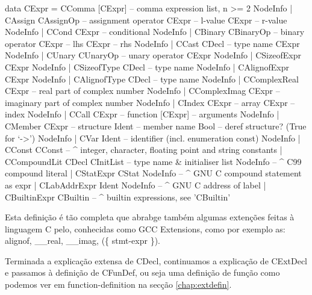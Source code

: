 \begin{haskell}
data CExpr = CComma       [CExpr]       -- comma expression list, n >= 2
             NodeInfo
           | CAssign      CAssignOp     -- assignment operator
             CExpr         -- l-value
             CExpr         -- r-value
             NodeInfo
           | CCond        CExpr         -- conditional
             NodeInfo
           | CBinary      CBinaryOp     -- binary operator
             CExpr         -- lhs
             CExpr         -- rhs
             NodeInfo
           | CCast        CDecl         -- type name
             CExpr
             NodeInfo
           | CUnary       CUnaryOp      -- unary operator
             CExpr
             NodeInfo
           | CSizeofExpr  CExpr
             NodeInfo
           | CSizeofType  CDecl         -- type name
             NodeInfo
           | CAlignofExpr CExpr
             NodeInfo
           | CAlignofType CDecl         -- type name
             NodeInfo
           | CComplexReal CExpr         -- real part of complex number
             NodeInfo
           | CComplexImag CExpr         -- imaginary part of complex number
             NodeInfo
           | CIndex       CExpr         -- array
             CExpr         -- index
             NodeInfo
           | CCall        CExpr         -- function
             [CExpr]       -- arguments
             NodeInfo
           | CMember      CExpr         -- structure
             Ident         -- member name
             Bool          -- deref structure? (True for `->')
             NodeInfo
           | CVar         Ident         -- identifier (incl. enumeration const)
             NodeInfo
           | CConst       CConst        -- ^ integer, character, floating point and string constants
           | CCompoundLit CDecl
             CInitList     -- type name & initialiser list
             NodeInfo      -- ^ C99 compound literal
           | CStatExpr    CStat NodeInfo  -- ^ GNU C compound statement as expr
           | CLabAddrExpr Ident NodeInfo  -- ^ GNU C address of label
           | CBuiltinExpr CBuiltin        -- ^ builtin expressions, see 'CBuiltin'
\end{haskell}
Esta definição é tão completa que abrabge também algumas extenções feitas à linguagem C pelo, conhecidas como
GCC Extensions, como por exemplo as: alignof, \_\_real, \_\_imag, (\{ stmt-expr \}).

Terminada a explicação extensa de \textrm{CDecl}, continuamos a explicação de \textrm{CExtDecl} e passamos à definição de
\textrm{CFunDef}, ou seja uma definição de função como podemos ver em \textrm{function-definition} na secção \ref{chap:extdefin}.

